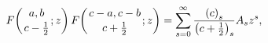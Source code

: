 \[\mathop{F\/}\nolimits\!\left({a,b\atop c-\frac{1}{2}};z\right)\mathop{F\/}%
\nolimits\!\left({c-a,c-b\atop c+\frac{1}{2}};z\right)=\sum_{s=0}^{\infty}%
\frac{\left(c\right)_{s}}{\left(c+\frac{1}{2}\right)_{s}}A_{s}z^{s},\]